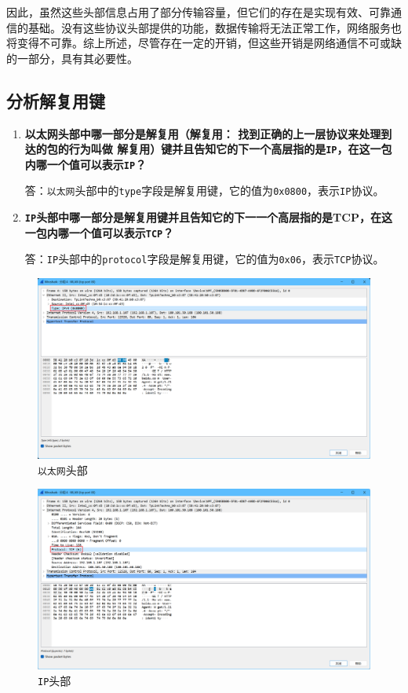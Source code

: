 \documentclass{article}
\begin{document}
因此，虽然这些头部信息占用了部分传输容量，但它们的存在是实现有效、可靠通信的基础。没有这些协议头部提供的功能，数据传输将无法正常工作，网络服务也将变得不可靠。综上所述，尽管存在一定的开销，但这些开销是网络通信不可或缺的一部分，具有其必要性。

\subsection{分析解复用键}

\begin{enumerate}[noitemsep]
  \item \textbf{以太网头部中哪一部分是解复用（解复用： 找到正确的上一层协议来处理到达的包的行为叫做 解复用）键并且告知它的下一个高层指的是\texttt{IP}，在这一包内哪一个值可以表示\texttt{IP}？}

  答：\texttt{以太网}头部中的\texttt{type}字段是解复用键，它的值为\texttt{0x0800}，表示\texttt{IP}协议。

  \item \textbf{\texttt{IP}头部中哪一部分是解复用键并且告知它的下一一个高层指的是TCP，在这一包内哪一个值可以表示\texttt{TCP}？}

  答：\texttt{IP}头部中的\texttt{protocol}字段是解复用键，它的值为\texttt{0x06}，表示\texttt{TCP}协议。
\end{enumerate}

\begin{figure}[H]
  \centering
  \includegraphics[width=13cm]{images/12.png}
  \caption{\texttt{以太网}头部}
\end{figure}

\begin{figure}[H]
  \centering
  \includegraphics[width=13cm]{images/13.png}
  \caption{\texttt{IP}头部}
\end{figure}
\end{document}
